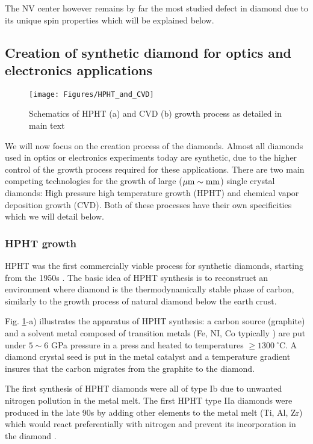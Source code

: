 \documentclass[a4paper,11pt]{report}
\begin{document}
The NV center however remains by far the most studied defect in diamond due to its unique spin properties which will be explained below.

\subsection{Creation of synthetic diamond for optics and electronics applications}
\begin{figure}[h!]
\centering
\texttt{[image: Figures/HPHT\_and\_CVD]}
\caption{Schematics of HPHT (a) and CVD (b) growth process as detailed in main text}
\label{HPHT and CVD}
\end{figure}

We will now focus on the creation process of the diamonds. Almost all diamonds used in optics or electronics experiments today are synthetic, due to the higher control of the growth process required for these applications. There are two main competing technologies for the growth of large ($\mu \rm{m} \sim \rm{mm}$) single crystal diamonds: High pressure high temperature growth (HPHT) and chemical vapor deposition growth (CVD). Both of these processes have their own specificities which we will detail below.

\subsubsection{HPHT growth}

HPHT was the first commercially viable process for synthetic diamonds, starting from the 1950s \citep{barnard2000diamond, bundy1955man}. The basic idea of HPHT synthesis is to reconstruct an environment where diamond is the thermodynamically stable phase of carbon, similarly to the growth process of natural diamond below the earth crust. 

Fig. \ref{HPHT and CVD}-a) illustrates the apparatus of HPHT synthesis: a carbon source (graphite) and a solvent metal composed of transition metals (Fe, NI, Co typically \citep{bundy1963direct}) are put under $5 \sim 6$ GPa pressure in a press and heated to temperatures $\geq 1300\ ^\circ$C. A diamond crystal seed is put in the metal catalyst and a temperature gradient insures that the carbon migrates from the graphite to the diamond.

The first synthesis of HPHT diamonds were all of type Ib due to unwanted nitrogen pollution in the metal melt. The first HPHT type IIa diamonds were produced in the late 90s by adding other elements to the metal melt (Ti, Al, Zr) which would react preferentially with nitrogen and prevent its incorporation in the diamond \citep{burns1999growth, sumiya2002growth}.
\end{document}
